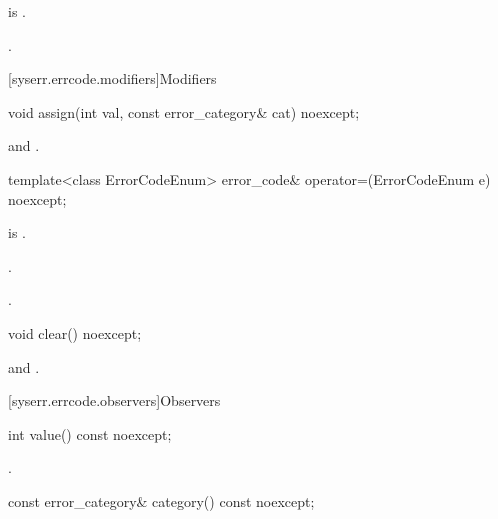 \begin{itemdescr}
\pnum
\constraints
{} is .

\pnum
\ensures
{}.
\end{itemdescr}

[syserr.errcode.modifiers]{Modifiers}

%
\begin{itemdecl}
void assign(int val, const error_category& cat) noexcept;
\end{itemdecl}

\begin{itemdescr}
\pnum
\ensures
{} and .
\end{itemdescr}

%
\begin{itemdecl}
template<class ErrorCodeEnum>
  error_code& operator=(ErrorCodeEnum e) noexcept;
\end{itemdecl}

\begin{itemdescr}
\pnum
\constraints
{} is .

\pnum
\ensures
{}.

\pnum
\returns
{}.
\end{itemdescr}

%
\begin{itemdecl}
void clear() noexcept;
\end{itemdecl}

\begin{itemdescr}
\pnum
\ensures
{} and .
\end{itemdescr}


[syserr.errcode.observers]{Observers}

%
\begin{itemdecl}
int value() const noexcept;
\end{itemdecl}

\begin{itemdescr}
\pnum
\returns
{}.
\end{itemdescr}

%
\begin{itemdecl}
const error_category& category() const noexcept;
\end{itemdecl}

